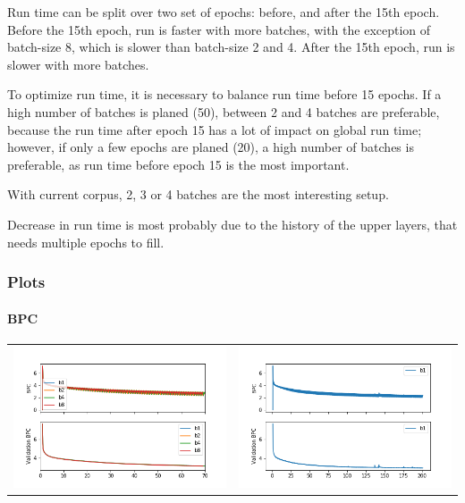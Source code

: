 Run time can be split over two set of epochs: before, and after the 15th
epoch. Before the 15th epoch, run is faster with more batches, with the
exception of batch-size 8, which is slower than batch-size 2 and 4.
After the 15th epoch, run is slower with more batches.

To optimize run time, it is necessary to balance run time before 15
epochs. If a high number of batches is planed (50),
between 2 and 4 batches are preferable, because the run time after epoch
15 has a lot of impact on global run time; however, if only a few epochs
are planed (20), a high number of batches is preferable, as
run time before epoch 15 is the most important.

With current corpus, 2, 3 or 4 batches are the most interesting setup.

Decrease in run time is most probably due to the history of the upper
layers, that needs multiple epochs to fill.

\subsubsection{Plots}

\paragraph{BPC}

\begin{tabular}{ll}
\includegraphics[width=.45\textwidth]{parts/appendix/reports-gmsnn/docs_esteban-latex/test_reports/2018-06-19/b1a8_frac.png}
&
\includegraphics[width=.45\textwidth]{parts/appendix/reports-gmsnn/docs_esteban-latex/test_reports/2018-06-19/b1a8_200.png}
\end{tabular}

